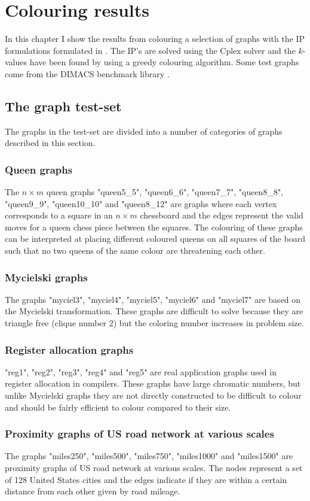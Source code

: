 \chapter{Colouring results}\label{chap:Results}
In this chapter I show the results from colouring a selection of graphs with the IP formulations formulated in . The IP's are solved using the Cplex\cite{cplex} solver and the $k$-values have been found by using a greedy colouring algorithm.
Some test graphs come from the DIMACS benchmark library \cite{dimacs}.
\section{The graph test-set}
The graphs in the test-set are divided into a number of categories of graphs described in this section.
\subsection{Queen graphs}
The $n\times m$ queen graphs "queen5\_5", "queen6\_6", "queen7\_7", "queen8\_8", "queen9\_9", "queen10\_10" and "queen8\_12" are graphs where each vertex corresponds to a square in an $n \times m$ chessboard and the edges represent the valid moves for a queen chess piece between the squares. The colouring of these graphs can be interpreted at placing different coloured queens on all squares of the board such that no two queens of the same colour are threatening each other.
\subsection{Mycielski graphs}
The graphs "myciel3", "myciel4", "myciel5", "myciel6" and "myciel7" are based on the Mycielski transformation. These graphs are difficult to solve because they are triangle free (clique number 2) but the coloring number increases in problem size.
\subsection{Register allocation graphs}
"reg1", "reg2", "reg3", "reg4" and "reg5" are real application graphs used in register allocation in compilers. These graphs have large chromatic numbers, but unlike Mycielski graphs they are not directly constructed to be difficult to colour and should be fairly efficient to colour compared to their size.
\subsection{Proximity graphs of US road network at various scales}
The graphs "miles250", "miles500", "miles750", "miles1000" and "miles1500" are proximity graphs of US road network at various scales. The nodes represent a set of 128 United States cities and the edges indicate if they are within a certain distance from each other given by road mileage.
